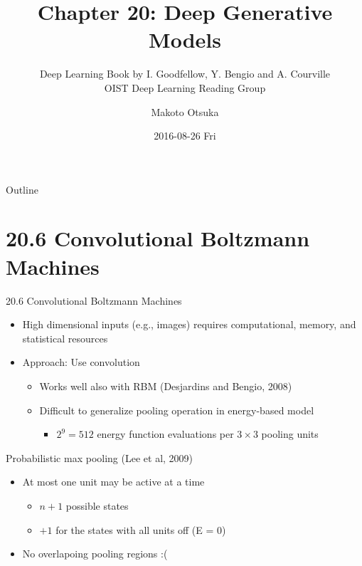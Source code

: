 \documentclass[dvipdfmx,presentation]{beamer}
\author{Makoto Otsuka}
\date{2016-08-26 Fri}
\title{Chapter 20: Deep Generative Models\\
}
\subtitle{Deep Learning Book by I. Goodfellow, Y. Bengio and A. Courville \\
OIST Deep Learning Reading Group}
\begin{document}
\maketitle
\begin{frame}{Outline}
\tableofcontents
\end{frame}


\section{20.6 Convolutional Boltzmann Machines}
\label{sec:orgheadline3}
\begin{frame}[label={sec:orgheadline1}]{20.6 Convolutional Boltzmann Machines}
\begin{itemize}
\item High dimensional inputs (e.g., images) requires computational, memory, and statistical resources
\item Approach: Use convolution
\begin{itemize}
\item Works well also with RBM (Desjardins and Bengio, 2008)
\item Difficult to generalize \alert{\alert{pooling operation}} in energy-based model
\begin{itemize}
\item \(2^{9} = 512\) energy function evaluations per \(3\times3\) pooling units
\end{itemize}
\end{itemize}
\end{itemize}
\begin{block}{Probabilistic max pooling (Lee et al, 2009)}
\begin{itemize}
\item At most one unit may be active at a time
\begin{itemize}
\item \(n+1\) possible states
\item \(+1\) for the states with all units off (E = 0)
\end{itemize}
\item No overlapoing pooling regions :(
\end{itemize}
\end{block}
\end{frame}
\end{document}
